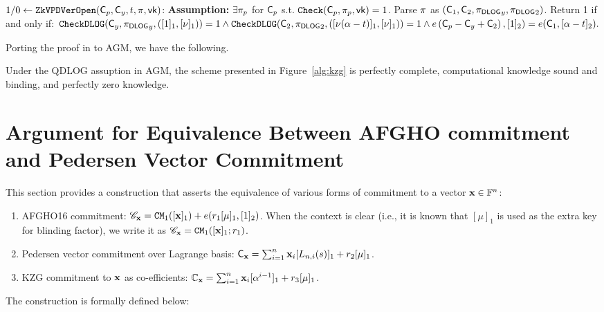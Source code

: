 \begin{scriptsize}
\begin{algorithm}[bt]
$1/0 \leftarrow \texttt{ZkVPDVerOpen}({\mathsf{C}}_p,{\mathsf{C}}_y,t,\pi,\mathsf{vk})$:  \newline
{\bf Assumption:}  $\exists \pi_p$ for ${\mathsf{C}}_p$
s.t. $\texttt{Check}({\mathsf{C}}_p, \pi_p, \mathsf{vk})=1$.
\newline
Parse $\pi$ as $({\mathsf{C}}_1, {\mathsf{C}}_2, {\pi_{{\textsf{DLOG}}}}_{y}, {\pi_{{\textsf{DLOG}}}}_{2})$.
Return 1 if and only if: \newline
$
\texttt{CheckDLOG}({\mathsf{C}}_y,{\pi_{{\textsf{DLOG}}}}_{y}, ([1]_1, [\nu]_1))=1 \wedge \texttt{CheckDLOG}({\mathsf{C}}_2,{\pi_{{\textsf{DLOG}}}}_{2}, ([\nu(\alpha-t)]_1, [\nu]_1))=1
\wedge e\left({\mathsf{C}}_p - {\mathsf{C}}_y + {\mathsf{C}}_2\right), [1]_2)
= e({\mathsf{C}}_1, [\alpha- t]_2).
$


\caption{Univariate zk-VPD Scheme}
\label{alg:kzg}
\end{algorithm}
\end{scriptsize}

Porting the proof in \cite{Zkreg} to AGM, we have the following.

\begin{lemma} Under the QDLOG assuption in AGM, the scheme presented
in Figure\ \ref{alg:kzg} is perfectly complete, computational
knowledge sound and binding, and perfectly zero knowledge.
\end{lemma}

\section{Argument for Equivalence Between AFGHO commitment and Pedersen
Vector Commitment}
\label{sec:eqcom}
This section provides a construction that asserts  
the equivalence of various forms of commitment
to a vector ${{\mathbf {x}}} \in \mathbb{F}^n$:
\begin{enumerate}
	\item AFGHO16 commitment: ${\mathscr{C}}_{{{\mathbf {x}}}} = {\mathtt{CM}}_1([{{\mathbf {x}}}]_1) + e(r_1[\mu]_1, [1]_2)$. When the context is clear (i.e., it is known that
	$[\mu]_1$ is used as the extra key for blinding factor),
	we write it as ${\mathscr{C}}_{{{\mathbf {x}}}} = {\mathtt{CM}}_1([{{\mathbf {x}}}]_1; r_1)$.
	\item Pedersen vector commitment over Lagrange basis:
	${\mathsf{C}}_{{{\mathbf {x}}}} = \sum_{i=1}^n {{\mathbf {x}}}_i 
		[L_{n,i}(s)]_1 + r_2[\mu]_1$. 
	\item KZG commitment to ${{\mathbf {x}}}$ as co-efficients:
		${\mathbb{C}}_{{{\mathbf {x}}}} = \sum_{i=1}^n {{\mathbf {x}}}_i [\alpha^{i-1}]_1 + r_3[\mu]_1$.
\end{enumerate}

The construction is formally defined below:

